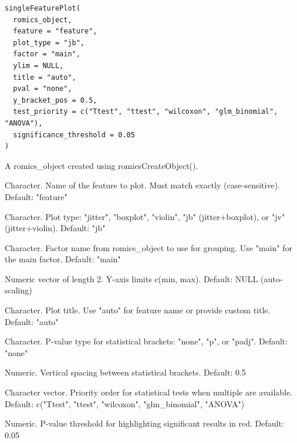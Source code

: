\documentclass[a4paper]{book}
\begin{document}
%
\begin{Usage}
\begin{verbatim}
singleFeaturePlot(
  romics_object,
  feature = "feature",
  plot_type = "jb",
  factor = "main",
  ylim = NULL,
  title = "auto",
  pval = "none",
  y_bracket_pos = 0.5,
  test_priority = c("Ttest", "ttest", "wilcoxon", "glm_binomial", "ANOVA"),
  significance_threshold = 0.05
)
\end{verbatim}
\end{Usage}
%
\begin{Arguments}
\begin{ldescription}
\item[\code{romics\_object}] A romics\_object created using romicsCreateObject().

\item[\code{feature}] Character. Name of the feature to plot. Must match exactly (case-sensitive). Default: "feature"

\item[\code{plot\_type}] Character. Plot type: "jitter", "boxplot", "violin", "jb" (jitter+boxplot), or "jv" (jitter+violin). Default: "jb"

\item[\code{factor}] Character. Factor name from romics\_object to use for grouping. Use "main" for the main factor. Default: "main"

\item[\code{ylim}] Numeric vector of length 2. Y-axis limits c(min, max). Default: NULL (auto-scaling)

\item[\code{title}] Character. Plot title. Use "auto" for feature name or provide custom title. Default: "auto"

\item[\code{pval}] Character. P-value type for statistical brackets: "none", "p", or "padj". Default: "none"

\item[\code{y\_bracket\_pos}] Numeric. Vertical spacing between statistical brackets. Default: 0.5

\item[\code{test\_priority}] Character vector. Priority order for statistical tests when multiple are available. Default: c("Ttest", "ttest", "wilcoxon", "glm\_binomial", "ANOVA")

\item[\code{significance\_threshold}] Numeric. P-value threshold for highlighting significant results in red. Default: 0.05
\end{ldescription}
\end{Arguments}
\end{document}
